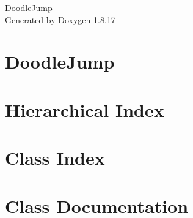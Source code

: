 \let\mypdfximage\pdfximage\def\pdfximage{\immediate\mypdfximage}\documentclass[twoside]{book}
\newcommand{\+}{\discretionary{\mbox{\scriptsize$\hookleftarrow$}}{}{}}
\newcommand{\clearemptydoublepage}{%
  \newpage{\pagestyle{empty}\cleardoublepage}%
}
\begin{document}
\hypersetup{pageanchor=false,
             bookmarksnumbered=true,
             pdfencoding=unicode
            }
\begin{titlepage}
\vspace*{7cm}
\begin{center}%
{\Large Doodle\+Jump }\\
\vspace*{1cm}
{\large Generated by Doxygen 1.8.17}\\
\end{center}
\end{titlepage}
\clearemptydoublepage
{}
\tableofcontents
\clearemptydoublepage
{}
\hypersetup{pageanchor=true}

\chapter{Doodle\+Jump}
\label{md__mnt_c_Users_ferit_OneDrive__xD0_xA0_xD0_xB0_xD0_xB1_xD0_xBE_xD1_x82_xD0_xB5_xD0_xBD__xD0_xBFc3ddce374656c7e0cfd1e7701b4a4e31}

\chapter{Hierarchical Index}

\chapter{Class Index}

\chapter{Class Documentation}


































\backmatter
\newpage
{}
\clearemptydoublepage
{}
\printindex
\end{document}
